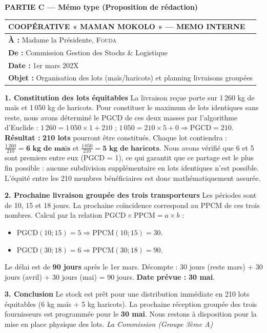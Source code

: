 \documentclass[11pt]{article}
\begin{document}
\begin{exoresolu}
\bigskip
\noindent \textbf{PARTIE C — Mémo type (Proposition de rédaction)}

\begin{center}
\begin{tabularx}{\linewidth}{|X|}\hline
\rowcolor{popblueL}
\textbf{COOPÉRATIVE « MAMAN MOKOLO » — MEMO INTERNE} \\ \hline
\textbf{À :} Madame la Présidente, \textsc{Fouda} \\
\textbf{De :} Commission Gestion des Stocks \& Logistique \\
\textbf{Date :} 1er mars 202X \\
\textbf{Objet :} Organisation des lots (maïs/haricots) et planning livraisons groupées \\ \hline
\end{tabularx}
\end{center}

\vspace{2mm}
\noindent \textbf{1. Constitution des lots équitables}
La livraison reçue porte sur 1\,260 kg de maïs et 1\,050 kg de haricots. Pour constituer le maximum de lots identiques sans reste, nous avons déterminé le PGCD de ces deux masses par l'algorithme d'Euclide :
$1\,260 = 1\,050 \times 1 + 210$ ; $1\,050 = 210 \times 5 + 0 \Rightarrow \text{PGCD} = 210$.
\textbf{Résultat :} \textbf{210 lots} pourront être constitués.
Chaque lot contiendra : $\frac{1\,260}{210} = \mathbf{6 \text{ kg de maïs}}$ et $\frac{1\,050}{210} = \mathbf{5 \text{ kg de haricots}}$.
Nous avons vérifié que 6 et 5 sont premiers entre eux (PGCD = 1), ce qui garantit que ce partage est le plus fin possible : aucune subdivision supplémentaire en lots identiques n'est possible. L'équité entre les 210 membres bénéficiaires est donc mathématiquement assurée.

\vspace{2mm}
\noindent \textbf{2. Prochaine livraison groupée des trois transporteurs}
Les périodes sont de 10, 15 et 18 jours. La prochaine coïncidence correspond au PPCM de ces trois nombres.
Calcul par la relation $\text{PGCD} \times \text{PPCM} = a \times b$ :
\begin{itemize}
    \item $\text{PGCD}(10;15)=5 \Rightarrow \text{PPCM}(10;15)=30$.
    \item $\text{PGCD}(30;18)=6 \Rightarrow \text{PPCM}(30;18)=90$.
\end{itemize}
Le délai est de \textbf{90 jours} après le 1er mars.
Décompte : 30 jours (reste mars) + 30 jours (avril) + 30 jours (mai) = 90 jours.
\textbf{Date prévue :} \textbf{30 mai}.

\vspace{2mm}
\noindent \textbf{3. Conclusion}
Le stock est prêt pour une distribution immédiate en 210 lots équitables (6 kg maïs + 5 kg haricots). La prochaine réception groupée des trois fournisseurs est programmée pour le \textbf{30 mai}. Nous restons à disposition pour la mise en place physique des lots.
\vspace{1mm}
\noindent \textit{La Commission (Groupe 3\`eme A)}
\end{exoresolu}
\end{document}
